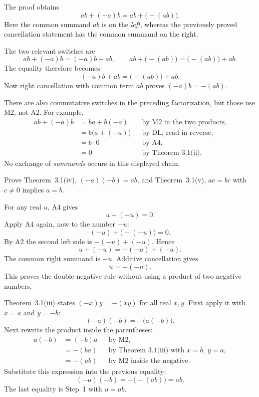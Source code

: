 
The proof obtains
\[
 ab+(-a)b=ab+\bigl(-(ab)\bigr).
\]
Here the common summand $ab$ is on the \emph{left}, whereas the previously
proved cancellation statement has the common summand on the right.

The two relevant switches are
\[
 ab+(-a)b=(-a)b+ab,
 \qquad
 ab+\bigl(-(ab)\bigr)=\bigl(-(ab)\bigr)+ab.
\]
The equality therefore becomes
\[
 (-a)b+ab=\bigl(-(ab)\bigr)+ab.
\]
Now right cancellation with common term $ab$ proves
$(-a)b=-(ab)$.

There are also commutative switches in the preceding factorization, but
those use M2, not A2. For example,
\begin{align*}
 ab+(-a)b
   &=ba+b(-a) &&\text{by M2 in the two products},\\
   &=b\bigl(a+(-a)\bigr) &&\text{by DL, read in reverse},\\
   &=b\cdot0 &&\text{by A4},\\
   &=0 &&\text{by Theorem~3.1(ii)}.
\end{align*}
No exchange of \emph{summands} occurs in this displayed chain.



\goal Prove Theorem~3.1(iv), $(-a)(-b)=ab$, and Theorem~3.1(v),
$ac=bc$ with $c\ne0$ implies $a=b$.

For any real $u$, A4 gives
\[
 u+(-u)=0.
\]
Apply A4 again, now to the number $-u$:
\[
 (-u)+\bigl(-(-u)\bigr)=0.
\]
By A2 the second left side is $-(-u)+(-u)$. Hence
\[
 u+(-u)=-(-u)+(-u).
\]
The common right summand is $-u$. Additive cancellation gives
\[
 u=-(-u).
\]
This proves the double-negative rule without using a product of two
negative numbers.

Theorem~3.1(iii) states $(-x)y=-(xy)$ for all real $x,y$.
First apply it with $x=a$ and $y=-b$:
\[
 (-a)(-b)=-\bigl(a(-b)\bigr).
\]
Next rewrite the product inside the parentheses:
\begin{align*}
 a(-b)
   &=(-b)a &&\text{by M2},\\
   &=-(ba) &&\text{by Theorem~3.1(iii) with $x=b$, $y=a$},\\
   &=-(ab) &&\text{by M2 inside the negative}.
\end{align*}
Substitute this expression into the previous equality:
\[
 (-a)(-b)=-\bigl(-(ab)\bigr)=ab.
\]
The last equality is Step~1 with $u=ab$.

